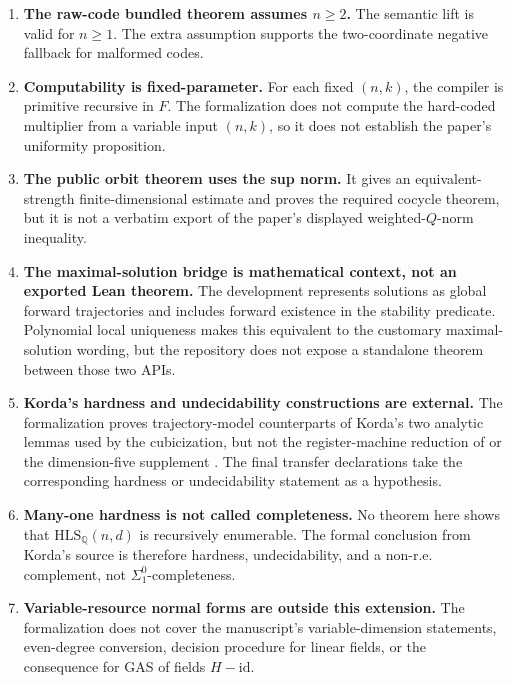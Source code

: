\documentclass[11pt]{article}
\newcommand{\Q}{\mathbb Q}
\newcommand{\HLS}{\mathrm{HLS}}
\begin{document}
\begin{enumerate}
\item \textbf{The raw-code bundled theorem assumes \(n\ge2\).}
  The semantic lift is valid for \(n\ge1\).  The extra assumption supports
  the two-coordinate negative fallback for malformed codes.

\item \textbf{Computability is fixed-parameter.}
  For each fixed \((n,k)\), the compiler is primitive recursive in \(F\).
  The formalization does not compute the hard-coded multiplier from a
  variable input \((n,k)\), so it does not establish the paper's uniformity
  proposition.

\item \textbf{The public orbit theorem uses the sup norm.}
  It gives an equivalent-strength finite-dimensional estimate and proves the
  required cocycle theorem, but it is not a verbatim export of the paper's
  displayed weighted-\(Q\)-norm inequality.

\item \textbf{The maximal-solution bridge is mathematical context, not an
  exported Lean theorem.}
  The development represents solutions as global forward trajectories and
  includes forward existence in the stability predicate.  Polynomial local
  uniqueness makes this equivalent to the customary maximal-solution wording,
  but the repository does not expose a standalone theorem between those two
  APIs.

\item \textbf{Korda's hardness and undecidability constructions are
  external.}
  The formalization proves trajectory-model counterparts of Korda's two
  analytic lemmas used by the cubicization, but not the register-machine
  reduction of \cite{Korda2026} or the dimension-five supplement
  \cite{KordaSupp2026}.  The final transfer declarations take the
  corresponding hardness or undecidability statement as a hypothesis.

\item \textbf{Many-one hardness is not called completeness.}
  No theorem here shows that \(\HLS_{\Q}(n,d)\) is recursively enumerable.
  The formal conclusion from Korda's source is therefore hardness,
  undecidability, and a non-r.e. complement, not
  \(\Sigma^0_1\)-completeness.

\item \textbf{Variable-resource normal forms are outside this extension.}
  The formalization does not cover the manuscript's variable-dimension
  statements, even-degree conversion, decision procedure for linear fields,
  or the consequence for GAS of fields \(H-\mathrm{id}\).
\end{enumerate}
\end{document}
